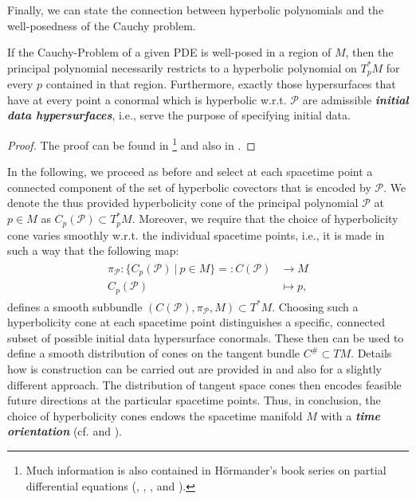 Finally, we can state the connection between hyperbolic polynomials and the well-posedness of the Cauchy problem.
\begin{theorem}
If the Cauchy-Problem of a given PDE is well-posed in a region of $M$, then the principal polynomial necessarily restricts to a hyperbolic polynomial on $T_p^{\ast}M$ for every $p$ contained in that region. Furthermore, exactly those hypersurfaces that have at every point a conormal which is hyperbolic w.r.t. $\mathcal{P}$ are admissible \textit{\textbf{initial data hypersurfaces}}, i.e., serve the purpose of specifying initial data.
\end{theorem}
\begin{proof}
The proof can be found in \cite{Hormander1977}\footnote{Much information is also contained in Hörmander's book series on partial differential equations (\cite{hormander1994analysis}, \cite{hormander2004analysis}, \cite{hormander2009analysis}, and \cite{hormander2015analysis}).} and also in \cite{Ivrii_1974}. 
\end{proof}
In the following, we proceed as before and select at each spacetime point a connected component of the set of hyperbolic covectors that is encoded by $\mathcal{P}$. We denote the thus provided hyperbolicity cone of the principal polynomial $\mathcal{P}$ at $p \in M$ as $C_p(\mathcal{P}) \subset T_p^{\ast}M$.
Moreover, we require that the choice of hyperbolicity cone varies smoothly w.r.t. the individual spacetime points, i.e., it is made in such a way that the following map:
\begin{align}
\begin{aligned}
\pi_{\mathcal{P}}: \{ C_p(\mathcal{P}) \ \vert \ p \in M\}=: C(\mathcal{P}) &\longrightarrow M\\
C_p(\mathcal{P}) &\longmapsto p,
\end{aligned}
\end{align}
defines a smooth subbundle $(C(\mathcal{P}), \pi_{\mathcal{P}}, M) \subset T^{\ast}M$.
Choosing such a hyperbolicity cone at each spacetime point distinguishes a specific, connected subset of possible initial data hypersurface conormals. These then can be used to define a smooth distribution of cones on the tangent bundle $C^{\#} \subset TM$. Details how is construction can be carried out are provided in \cite{Rivera} and also \cite{2012arXiv1211.1914K} for a slightly different approach.
The distribution of tangent space cones then encodes feasible future directions at the particular spacetime points.
Thus, in conclusion,  the choice of hyperbolicity cones endows the spacetime manifold $M$ with a \textit{\textbf{time orientation}} (cf. \cite{2012arXiv1211.1914K} and \cite{Rivera}).

